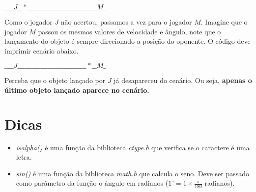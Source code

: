 \documentclass{article}
\begin{document}
\begin{center}
    $\_\_\_\_J\_\_*\_\_\_\_\_\_\_\_\_\_\_\_\_\_\_\_\_\_\_\_\_\_\_\_\_\_\_\_\_\_M\_$
\end{center}

Como o jogador $J$ não acertou, passamos a vez para o jogador $M$. Imagine que o jogador $M$ passou os mesmos valores de velocidade e ângulo, note que o lançamento do objeto é sempre direcionado a posição do oponente. O código deve imprimir cenário abaixo.

\begin{center}
    $\_\_\_\_J\_\_\_\_\_\_\_\_\_\_\_\_\_\_\_\_\_\_\_\_\_\_\_\_\_\_\_\_\_\_*\_\_M\_$
\end{center}


Perceba que o objeto lançado por $J$ já desapareceu do cenário. Ou seja, \textbf{apenas o último objeto lançado aparece no cenário.}


\section{Dicas}
\begin{itemize}
\item \textit{isalpha()} é uma função da biblioteca \textit{ctype.h} que verifica se o caractere é uma letra.
\item \textit{sin()} é uma função da biblioteca \textit{math.h} que calcula o seno. Deve ser passado como parâmetro da função o ângulo em radianos ($1^{\circ} = 1 \times \frac{\pi}{180}$ radianos). 
\end{itemize}
\end{document}
